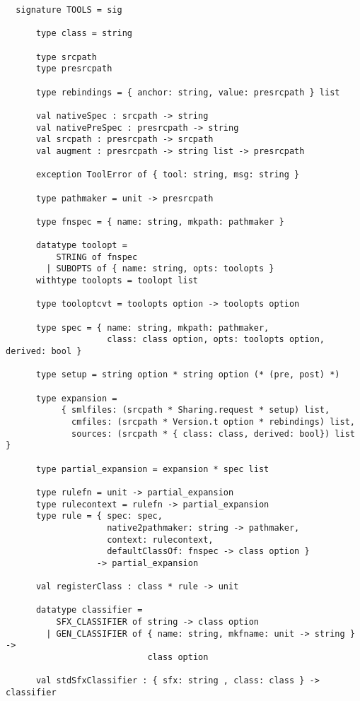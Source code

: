 \begin{lstlisting}
  signature TOOLS = sig

      type class = string

      type srcpath
      type presrcpath

      type rebindings = { anchor: string, value: presrcpath } list

      val nativeSpec : srcpath -> string
      val nativePreSpec : presrcpath -> string
      val srcpath : presrcpath -> srcpath
      val augment : presrcpath -> string list -> presrcpath

      exception ToolError of { tool: string, msg: string }

      type pathmaker = unit -> presrcpath

      type fnspec = { name: string, mkpath: pathmaker }

      datatype toolopt =
          STRING of fnspec
        | SUBOPTS of { name: string, opts: toolopts }
      withtype toolopts = toolopt list

      type tooloptcvt = toolopts option -> toolopts option

      type spec = { name: string, mkpath: pathmaker,
                    class: class option, opts: toolopts option, derived: bool }

      type setup = string option * string option (* (pre, post) *)

      type expansion =
           { smlfiles: (srcpath * Sharing.request * setup) list,
             cmfiles: (srcpath * Version.t option * rebindings) list,
             sources: (srcpath * { class: class, derived: bool}) list }

      type partial_expansion = expansion * spec list

      type rulefn = unit -> partial_expansion
      type rulecontext = rulefn -> partial_expansion
      type rule = { spec: spec,
                    native2pathmaker: string -> pathmaker,
                    context: rulecontext,
                    defaultClassOf: fnspec -> class option }
                  -> partial_expansion

      val registerClass : class * rule -> unit

      datatype classifier =
          SFX_CLASSIFIER of string -> class option
        | GEN_CLASSIFIER of { name: string, mkfname: unit -> string } ->
                            class option

      val stdSfxClassifier : { sfx: string , class: class } -> classifier


\end{lstlisting}
